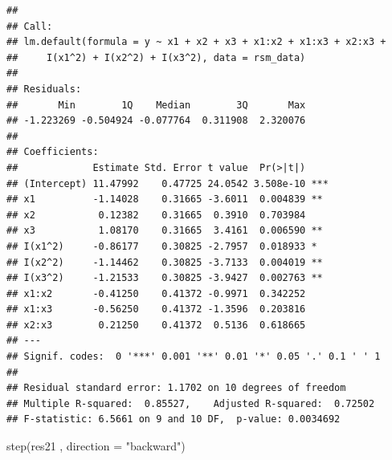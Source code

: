 \documentclass[
]{book}
\newenvironment{Shaded}{\begin{snugshade}}{\end{snugshade}}
\newcommand{\AttributeTok}[1]{\textcolor[rgb]{0.77,0.63,0.00}{#1}}
\newcommand{\FunctionTok}[1]{\textcolor[rgb]{0.00,0.00,0.00}{#1}}
\newcommand{\NormalTok}[1]{#1}
\newcommand{\StringTok}[1]{\textcolor[rgb]{0.31,0.60,0.02}{#1}}
\theoremstyle{definition}
\theoremstyle{definition}
\theoremstyle{definition}
\theoremstyle{definition}
\theoremstyle{remark}
\begin{document}
\begin{verbatim}
## 
## Call:
## lm.default(formula = y ~ x1 + x2 + x3 + x1:x2 + x1:x3 + x2:x3 + 
##     I(x1^2) + I(x2^2) + I(x3^2), data = rsm_data)
## 
## Residuals:
##       Min        1Q    Median        3Q       Max 
## -1.223269 -0.504924 -0.077764  0.311908  2.320076 
## 
## Coefficients:
##             Estimate Std. Error t value  Pr(>|t|)    
## (Intercept) 11.47992    0.47725 24.0542 3.508e-10 ***
## x1          -1.14028    0.31665 -3.6011  0.004839 ** 
## x2           0.12382    0.31665  0.3910  0.703984    
## x3           1.08170    0.31665  3.4161  0.006590 ** 
## I(x1^2)     -0.86177    0.30825 -2.7957  0.018933 *  
## I(x2^2)     -1.14462    0.30825 -3.7133  0.004019 ** 
## I(x3^2)     -1.21533    0.30825 -3.9427  0.002763 ** 
## x1:x2       -0.41250    0.41372 -0.9971  0.342252    
## x1:x3       -0.56250    0.41372 -1.3596  0.203816    
## x2:x3        0.21250    0.41372  0.5136  0.618665    
## ---
## Signif. codes:  0 '***' 0.001 '**' 0.01 '*' 0.05 '.' 0.1 ' ' 1
## 
## Residual standard error: 1.1702 on 10 degrees of freedom
## Multiple R-squared:  0.85527,    Adjusted R-squared:  0.72502 
## F-statistic: 6.5661 on 9 and 10 DF,  p-value: 0.0034692
\end{verbatim}

\begin{Shaded}
\begin{Highlighting}[]
\FunctionTok{step}\NormalTok{(res21 , }\AttributeTok{direction =} \StringTok{"backward"}\NormalTok{)}
\end{Highlighting}
\end{Shaded}
\end{document}
